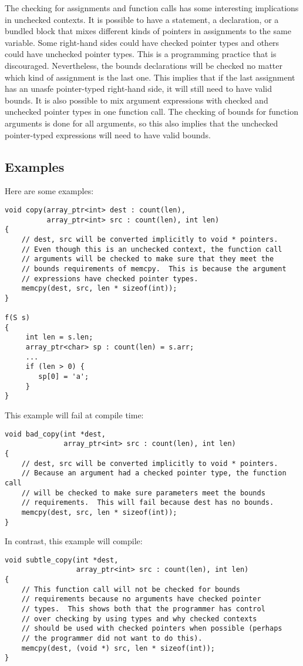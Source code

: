 The checking for assignments and function calls has some interesting 
implications in unchecked contexts.  It is possible to have a statement, 
a declaration, or a bundled block that mixes different kinds of pointers
in assignments to the same  variable.  
Some right-hand sides could have checked pointer types and others
could have unchecked pointer types.  This is a programming practice that is discouraged.
Nevertheless, the bounds declarations will be checked no matter which
kind of assignment is the last one.  This implies that if the last 
assignment has an unasfe pointer-typed right-hand side, it will still need
to have valid bounds.   It is also possible to mix argument expressions with 
checked and unchecked  pointer types in one function call.  The checking of bounds
for function arguments is done for all arguments, so this also implies that the unchecked
pointer-typed expressions will need to have valid bounds.

\subsection{Examples}

Here are some examples:
\begin{verbatim}
void copy(array_ptr<int> dest : count(len), 
          array_ptr<int> src : count(len), int len)
{
    // dest, src will be converted implicitly to void * pointers.
    // Even though this is an unchecked context, the function call
    // arguments will be checked to make sure that they meet the
    // bounds requirements of memcpy.  This is because the argument
    // expressions have checked pointer types.
    memcpy(dest, src, len * sizeof(int));
}
 
f(S s) 
{
     int len = s.len;
     array_ptr<char> sp : count(len) = s.arr;
     ...
     if (len > 0) {
        sp[0] = 'a';
     }
}
\end{verbatim}

This example will fail at compile time:
\begin{verbatim}
void bad_copy(int *dest,
              array_ptr<int> src : count(len), int len)
{
    // dest, src will be converted implicitly to void * pointers.
    // Because an argument had a checked pointer type, the function call
    // will be checked to make sure parameters meet the bounds
    // requirements.  This will fail because dest has no bounds.
    memcpy(dest, src, len * sizeof(int));
}
\end{verbatim}

In contrast, this example will compile:
\begin{verbatim}
void subtle_copy(int *dest,
                 array_ptr<int> src : count(len), int len)
{
    // This function call will not be checked for bounds
    // requirements because no arguments have checked pointer
    // types.  This shows both that the programmer has control
    // over checking by using types and why checked contexts
    // should be used with checked pointers when possible (perhaps
    // the programmer did not want to do this).
    memcpy(dest, (void *) src, len * sizeof(int));
}
\end{verbatim}

